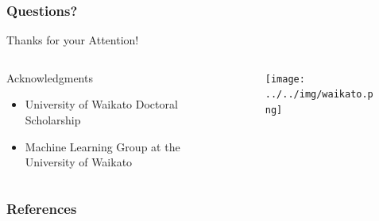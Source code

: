 \documentclass[handout]{beamer}
\begin{document}
\begin{frame}
\frametitle{Questions?}
\begin{center}\LARGE Thanks for your Attention!\\ \end{center}

\begin{columns}
\begin{column}{0.55\textwidth}
\begin{block}{Acknowledgments}
\begin{itemize}\tiny
	\item University of Waikato Doctoral Scholarship
	\item Machine Learning Group at the University of Waikato
	
\end{itemize}
\end{block}
\end{column}
\begin{column}{0.45\textwidth}
\vspace{1.5cm}

\begin{figure}[h!]
	\centering
	\texttt{[image: ../../img/waikato.png]}
\end{figure}
\end{column}
\end{columns}

\end{frame}

\begin{frame}[allowframebreaks]\scriptsize
\frametitle{References}


%
\end{frame}  


\end{document}
